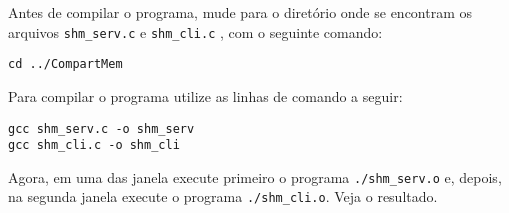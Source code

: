 Antes de compilar o programa, mude para o diretório onde se encontram os arquivos \texttt{shm\_serv.c} e \texttt{shm\_cli.c} , com o seguinte comando:
\begin{lstlisting}[style=MyBashStyle]
cd ../CompartMem
\end{lstlisting}


Para compilar o programa utilize as linhas de comando a seguir:
\begin{lstlisting}[style=MyBashStyle]
gcc shm_serv.c -o shm_serv
gcc shm_cli.c -o shm_cli
\end{lstlisting}

Agora, em uma das janela execute primeiro o programa \texttt{./shm\_serv.o} e, depois, na segunda janela execute o programa \texttt{./shm\_cli.o}. Veja o resultado.